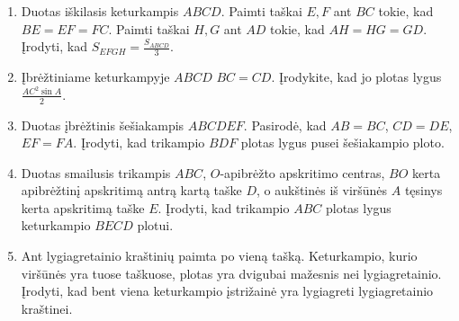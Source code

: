 \begin{enumerate}
\item Duotas iškilasis keturkampis $ABCD$. Paimti taškai $E,F$
  ant $BC$ tokie, kad $BE=EF=FC$. Paimti taškai $H,G$ ant $AD$ tokie, 
  kad $AH=HG=GD$. Įrodyti, kad $S_{EFGH}=\frac{S_{ABCD}}{3}$.
   
\item Įbrėžtiniame keturkampyje $ABCD$ $BC=CD$. Įrodykite,
  kad jo plotas lygus $\frac{AC^2\sin A}{2}$. 

\item Duotas įbrėžtinis šešiakampis $ABCDEF$. Pasirodė, kad
  $AB=BC$, $CD=DE$, $EF=FA$. Įrodyti, kad trikampio $BDF$
  plotas lygus pusei šešiakampio ploto.

\item Duotas smailusis trikampis $ABC$, $O$-apibrėžto
  apskritimo centras, $BO$ kerta apibrėžtinį apskritimą
  antrą kartą taške $D$, o aukštinės iš viršūnės $A$ tęsinys
  kerta apskritimą taške $E$. Įrodyti, kad trikampio $ABC$
  plotas lygus keturkampio $BECD$ plotui.

\item  Ant lygiagretainio kraštinių paimta po vieną tašką. 
  Keturkampio, kurio viršūnės yra tuose taškuose, plotas yra
  dvigubai mažesnis nei lygiagretainio. Įrodyti, kad bent viena 
  keturkampio įstrižainė yra lygiagreti lygiagretainio kraštinei.


\end{enumerate}
